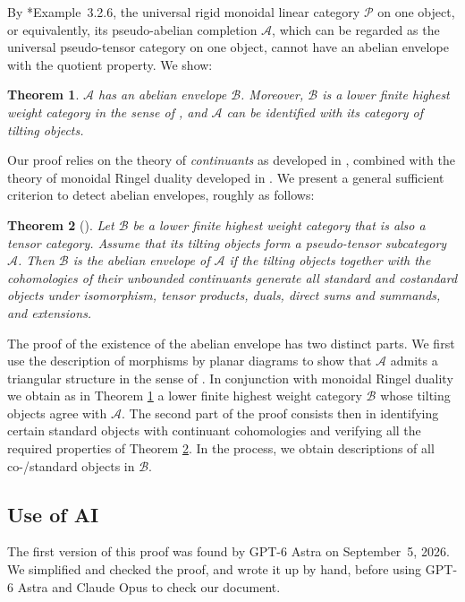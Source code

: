 \documentclass[11pt,oneside]{amsart}
\newtheorem{introtheorem}{Theorem}
\theoremstyle{definition}
\theoremstyle{remark}
\newcommand\cA{\mathcal A}
\newcommand\cB{\mathcal B}
\newcommand\cP{\mathcal P}
\renewcommand\:\colon
\begin{document}
By \cite{CEOP}*{Example~3.2.6}, the universal rigid monoidal linear category $\cP$ on one object, or equivalently, its pseudo-abelian completion $\cA$, which can be regarded as the universal pseudo-tensor category on one object, cannot have an abelian envelope with the quotient property. We show:

\begin{introtheorem} \label{intro-a} $\cA$ has an abelian envelope $\cB$. Moreover, $\cB$ is a lower finite highest weight category in the sense of \cite{BS}, and $\cA$ can be identified with its category of tilting objects.
\end{introtheorem}

Our proof relies on the theory of \emph{continuants} as developed in \cite{CE}, combined with the theory of monoidal Ringel duality developed in \cites{SS,FG}. We present a general sufficient criterion to detect abelian envelopes, roughly as follows:

\begin{introtheorem}[] \label{intro-b} Let $\cB$ be a lower finite highest weight category that is also a tensor category. Assume that its tilting objects form a pseudo-tensor subcategory $\cA$. Then $\cB$ is the abelian envelope of $\cA$ if the tilting objects together with the cohomologies of their unbounded continuants generate all standard and costandard objects under isomorphism, tensor products, duals,  direct sums and summands, and extensions.
\end{introtheorem}

The proof of the existence of the abelian envelope has two distinct parts. We first use the description of morphisms by planar diagrams to show that $\cA$ admits a triangular structure in the sense of \cite{SS}. In conjunction with monoidal Ringel duality \cite{FG} we obtain as in Theorem \ref{intro-a} a lower finite highest weight category $\cB$ whose tilting objects agree with $\cA$. The second part of the proof consists then in identifying certain standard objects with continuant cohomologies and verifying all the required properties of Theorem \ref{intro-b}. In the process, we obtain descriptions of all co-/standard objects in $\cB$.

\subsection*{Use of AI} The first version of this proof was found by GPT-6 Astra \cite{astra} on September~5, 2026. We simplified and checked the proof, and wrote it up by hand, before using GPT-6 Astra and Claude Opus \cite{opus} to check our document.
\end{document}
